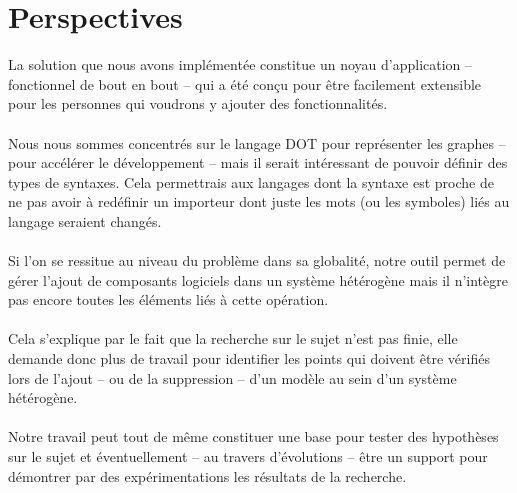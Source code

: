 \documentclass[12pt,a4paper]{report}
\begin{document}
\section{Perspectives}
La solution que nous avons implémentée constitue un noyau d'application -- fonctionnel de bout en bout -- qui a été conçu 
pour être facilement extensible pour les personnes qui voudrons y ajouter des fonctionnalités. 
\\\\
Nous nous sommes concentrés sur
le langage DOT pour représenter les graphes -- pour accélérer le développement -- mais il serait intéressant de pouvoir définir des types de syntaxes.
Cela permettrais aux langages dont la syntaxe est proche de ne pas avoir à redéfinir un importeur dont juste les mots (ou les symboles)
liés au langage seraient changés. 
\\\\
Si l'on se ressitue au niveau du problème dans sa globalité, notre outil permet de gérer l'ajout de composants logiciels
dans un système hétérogène mais il n'intègre pas encore toutes les éléments liés à cette opération. 
\\\\
Cela s'explique par le fait que la recherche sur le sujet n'est pas finie, elle demande donc plus de travail pour identifier
les points qui doivent être vérifiés lors de l'ajout -- ou de la suppression -- d'un modèle au sein d'un système hétérogène.
\\\\
Notre travail peut tout de même constituer une base pour tester des hypothèses sur le sujet et éventuellement  -- au travers
d'évolutions -- être un support pour démontrer par des expérimentations les résultats de la recherche.
\end{document}
